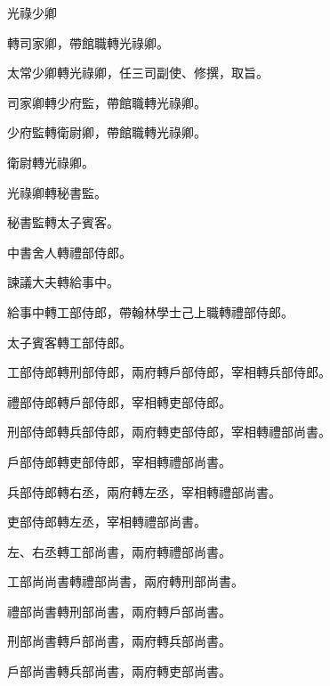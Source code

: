 \begin{pinyinscope}
 光祿少卿



 轉司家卿，帶館職轉光祿卿。



 太常少卿轉光祿卿，任三司副使、修撰，取旨。



 司家卿轉少府監，帶館職轉光祿卿。



 少府監轉衛尉卿，帶館職轉光祿卿。



 衛尉轉光祿卿。



 光祿卿轉秘書監。



 秘書監轉太子賓客。



 中書舍人轉禮部侍郎。



 諫議大夫轉給事中。



 給事中轉工部侍郎，帶翰林學士己上職轉禮部侍郎。



 太子賓客轉工部侍郎。



 工部侍郎轉刑部侍郎，兩府轉戶部侍郎，宰相轉兵部侍郎。



 禮部侍郎轉戶部侍郎，宰相轉吏部侍郎。



 刑部侍郎轉兵部侍郎，兩府轉吏部侍郎，宰相轉禮部尚書。



 戶部侍郎轉吏部侍郎，宰相轉禮部尚書。



 兵部侍郎轉右丞，兩府轉左丞，宰相轉禮部尚書。



 吏部侍郎轉左丞，宰相轉禮部尚書。



 左、右丞轉工部尚書，兩府轉禮部尚書。



 工部尚尚書轉禮部尚書，兩府轉刑部尚書。



 禮部尚書轉刑部尚書，兩府轉戶部尚書。



 刑部尚書轉戶部尚書，兩府轉兵部尚書。



 戶部尚書轉兵部尚書，兩府轉吏部尚書。




\end{pinyinscope}
